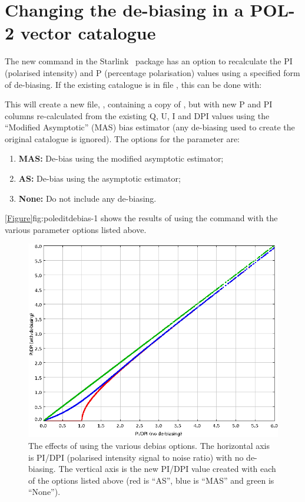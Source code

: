 \section{Changing the de-biasing in a POL-2 vector catalogue}

The new  command in the Starlink \POLPACK\ package has an option to recalculate the PI (polarised intensity) and P (percentage polarisation) values using a specified form of de-biasing. If the existing catalogue is in file , this can be done with:

\begin{terminalv}
\end{terminalv}

This will create a new file, , containing a copy of , but with new P and PI columns re-calculated from the existing Q, U, I and DPI values using the ``Modified Asymptotic'' (MAS) bias estimator (any de-biasing used to create the original catalogue is ignored). The options for the  parameter are:

\begin{enumerate}
\item {\bf MAS:} De-bias using the modified asymptotic estimator;
\item {\bf AS:} De-bias using the asymptotic estimator;
\item {\bf None:} Do not include any de-biasing.
\end{enumerate}

\cref{Figure}{fig:poleditdebias-1}{} shows the results of using the  command with the various   parameter options listed above.

\begin{figure}[ht!]
\begin{center}
\includegraphics[width=0.8\linewidth]{sc22-poledit-debias.png}
\caption [The effects of using the various  debias options]{
  The effects of using the various  debias options. The horizontal axis is PI/DPI (polarised intensity signal to noise ratio) with no de-biasing. The vertical axis is the new PI/DPI value created with each of the  options listed above (red is ``AS'', blue is ``MAS'' and green is ``None'').
\label{fig:poleditdebias-1}
}
\end{center}
\end{figure}


